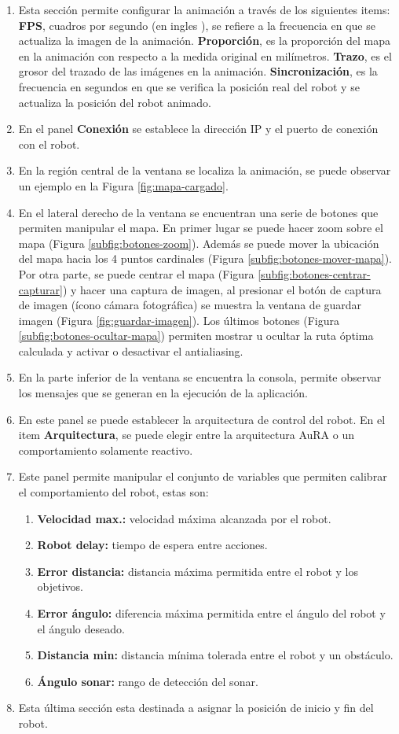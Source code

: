 \documentclass[11pt,twoside,A5]{article}
\newcommand{\reffigure}[1]{Figura \ref{#1}}
\newcommand{\refpfigure}[1]{(\reffigure{#1})}
\begin{document}
\begin{enumerate}
\item Esta sección permite configurar la animación 
a través de los siguientes items: \textbf{FPS}, cuadros por segundo (en ingles ), 
se refiere a la frecuencia en que se actualiza la imagen de la animación. \textbf{Proporción}, es la proporción del mapa en 
la animación con respecto a la medida original en milímetros. \textbf{Trazo}, es el grosor del trazado de las imágenes en la 
animación. \textbf{Sincronización}, es la frecuencia en segundos en que se verifica la posición real del robot y se actualiza la 
posición del robot animado.
\item En el panel \textbf{Conexión} se establece la dirección IP y el puerto de conexión con el robot.
\item En la región central de la ventana se localiza la animación, se puede observar un ejemplo en la \reffigure{fig:mapa-cargado}. 
\item En el lateral derecho de la ventana se encuentran una serie de botones que permiten manipular el mapa.
 En primer lugar 
se puede hacer zoom sobre el mapa \refpfigure{subfig:botones-zoom}. Además se puede mover la ubicación del mapa hacia los 4 puntos 
cardinales \refpfigure{subfig:botones-mover-mapa}. Por otra parte, se puede centrar el mapa \refpfigure{subfig:botones-centrar-capturar} y hacer una captura de imagen, al presionar el botón de captura de imagen (ícono cámara fotográfica) se
muestra la ventana de guardar imagen \refpfigure{fig:guardar-imagen}. Los últimos botones \refpfigure{subfig:botones-ocultar-mapa} permiten mostrar u ocultar
la ruta óptima calculada y activar o desactivar el antialiasing.
\item En la parte inferior de la ventana se encuentra la consola, permite observar los mensajes que se generan en la ejecución
de la aplicación.
\item En este panel se puede establecer la arquitectura de control del robot.
En el item \textbf{Arquitectura}, se puede elegir entre la arquitectura AuRA o un comportamiento solamente reactivo.
\item Este panel permite manipular el conjunto de variables que permiten calibrar el comportamiento del robot, estas son:
\begin{enumerate}
\item \textbf{Velocidad max.:} velocidad máxima alcanzada por el robot.
\item \textbf{Robot delay:} tiempo de espera entre acciones.
\item \textbf{Error distancia:} distancia máxima permitida entre el robot y los objetivos.
\item \textbf{Error ángulo:} diferencia máxima permitida entre el ángulo del robot y el ángulo deseado.
\item \textbf{Distancia min:} distancia mínima tolerada entre el robot y un obstáculo.
\item \textbf{Ángulo sonar:} rango de detección del sonar.
\end{enumerate}
\item Esta última sección esta destinada a asignar la posición de inicio y fin del robot.
\end{enumerate} 
\end{document}
